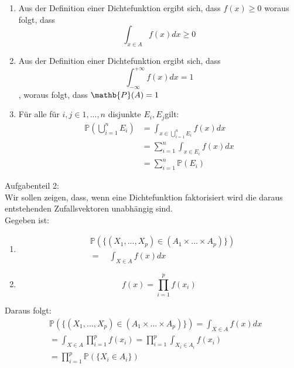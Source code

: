 \documentclass{newlayout}
\begin{document}
\begin{enumerate}
\item Aus der Definition einer Dichtefunktion ergibt sich, dass $f(x)\geq 0$ woraus folgt, dass \begin{equation*}\int_{x\in A}f(x)dx\geq 0\end{equation*}
\item Aus der Definition einer Dichtefunktion ergibt sich, dass \begin{equation*}\int_{-\infty}^{+\infty}f(x)dx= 1\end{equation*}, woraus folgt, dass $\mathb{P}(A)=1$\\
\item Für alle für $i,j\in 1,...,n$ disjunkte $E_i,E_j$gilt:
\begin{align*}
\mathbb{P}(\bigcup_{i=1}^{n} E_i)&=\int_{x\in \bigcup_{i=1}^{n}E_i}{f(x)dx}\\
&=\sum_{i=1}^{n}{\int_{x\in E_i}{f(x)dx}}\\
&=\sum_{i=1}^{n}{\mathbb{P}(E_i)}
\end{align*}
\end{enumerate}
Aufgabenteil 2:\\
Wir sollen zeigen, dass, wenn eine Dichtefunktion faktorisiert wird die daraus entstehenden Zufallsvektoren unabhängig sind.\\
Gegeben ist:
\begin{enumerate}
\item \begin{align*}&\mathbb{P}(\{(X_{1}, ... , X_{p}) \in (A_{1} \times ... \times A_{p})\} )\\ &= \quad \int_{X \in A}{f(x)dx}\end{align*}
\item \begin{equation*}f(x) = \prod_{i=1}^{p}{f(x_{i})}\end{equation*}
\end{enumerate}
Daraus folgt:
\begin{align*}
&\mathbb{P}(\{(X_{1}, ... , X_{p}) \in (A_{1} \times ... \times A_{p})\} ) = \int_{X \in A}{f(x)dx}\\
&= \int_{X \in A}{\prod_{i=1}^{p}{f(x_{i})}} = \prod_{i=1}^{p}{\int_{X_{i} \in A_{i}}{f(x_{i})}}\\
&= \prod_{i=1}^{p}{\mathbb{P} (\{X_{i} \in A_{i}\})}
\end{align*}
\end{document}
